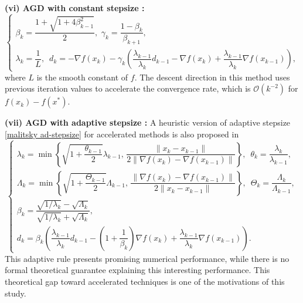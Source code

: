 \documentclass[11pt, a4paper, oneside, reqno]{amsart}
\begin{document}
\textbf{(vi) AGD with constant stepsize \cite{Nesterov1983}:}
        \begin{equation*}
        \begin{cases}
            \beta_k = \dfrac{1+\sqrt{1+4\beta_{k-1}^2}}{2}, \,\, \gamma_k = \dfrac{1-\beta_k}{\beta_{k+1}},\\
            \lambda_k = \dfrac{1}{L},\,\,\, d_k = -\nabla f(x_k)-\gamma_k \left (\dfrac{\lambda_{k-1}}{\lambda_k} d_{k-1} - \nabla f(x_k) + \dfrac{\lambda_{k-1}}{\lambda_k}\nabla f(x_{k-1}) \right),
        \end{cases}
        \end{equation*}
where $L$ is the smooth constant of $f$. The descent direction in this method uses previous iteration values to accelerate the convergence rate, which is $\mathcal{O}(k^{-2})$ for $f(x_k) - f(x^*)$.
    
\textbf{(vii) AGD with adaptive stepsize \cite{Malitsky2020}:} A heuristic version of adaptive stepsize \eqref{malitsky ad-stepsize} for accelerated methods is also proposed in \cite[Section 3]{Malitsky2020}
    \begin{equation*}
        \begin{cases}
            \lambda_k = \min \left \{\sqrt{1+\dfrac{\theta_{k-1}}{2}}\lambda_{k-1}, \, \dfrac{\|x_k - x_{k-1}\|}{2\|\nabla f(x_k) - \nabla f(x_{k-1})\|}\right \}, \,\,\, \theta_k = \dfrac{\lambda_k}{\lambda_{k-1}},\\
            \Lambda_k = \min \left \{\sqrt{1+\dfrac{\Theta_{k-1}}{2}}\Lambda_{k-1}, \, \dfrac{\|\nabla f(x_k) - \nabla f(x_{k-1})\|}{2\|x_k - x_{k-1}\|}\right \}, \,\,\, \Theta_k = \dfrac{\Lambda_k}{\Lambda_{k-1}},\\
            \beta_k = \dfrac{\sqrt{1/ \lambda_k} - \sqrt{\Lambda_k}}{\sqrt{1/ \lambda_k} + \sqrt{\Lambda_k}},\\
            d_k = \beta_k \left(\dfrac{\lambda_{k-1}}{\lambda_k} d_{k-1} - (1 + \dfrac{1}{\beta_k})\nabla f(x_k) + \dfrac{\lambda_{k-1}}{\lambda_k}\nabla f(x_{k-1}) \right).
        \end{cases}
    \end{equation*}
This adaptive rule presents promising numerical performance, while there is no formal theoretical guarantee explaining this interesting performance. This theoretical gap toward accelerated techniques is one of the motivations of this study.
        
\end{document}
